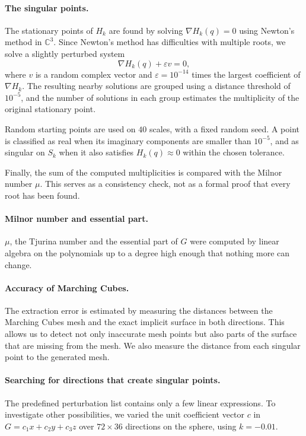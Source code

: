 \documentclass[12pt, a4paper]{article}
\theoremstyle{plain}
\theoremstyle{definition}
\theoremstyle{remark}
\theoremstyle{definition}
\begin{document}
\paragraph{The singular points.}
The stationary points of $H_k$ are found by solving
$\nabla H_k(q)=0$ using Newton's method in $\mathbb{C}^3$.
Since Newton's method has difficulties with multiple roots,
we solve a slightly perturbed system
\[
\nabla H_k(q)+\varepsilon v=0,
\]
where $v$ is a random complex vector and $\varepsilon=10^{-14}$
times the largest coefficient of $\nabla H_k$. The resulting nearby
solutions are grouped using a distance threshold of $10^{-5}$,
and the number of solutions in each group estimates the
multiplicity of the original stationary point.

Random starting points are used on $40$ scales, with a fixed
random seed. A point is classified as real when its imaginary
components are smaller than $10^{-5}$, and as singular on $S_k$
when it also satisfies $H_k(q)\approx0$ within the chosen tolerance.

Finally, the sum of the computed multiplicities is compared with
the Milnor number $\mu$. This serves as a consistency check, not
as a formal proof that every root has been found.


\paragraph{Milnor number and essential part.} $\mu$, the Tjurina number and the
essential part of $G$ were computed by linear algebra on the polynomials up to a degree high enough that nothing more can change.\cite{greuel2008singular}


\paragraph{Accuracy of Marching Cubes.}
The extraction error is estimated by measuring the distances between the Marching Cubes mesh and the exact implicit surface in both directions. 
This allows us to detect not only inaccurate mesh points but also parts of the surface that are missing from the mesh. 
We also measure the distance from each singular point to the generated mesh.


\paragraph{Searching for directions that create singular points.}
The predefined perturbation list contains only a few linear expressions. 
To investigate other possibilities, we varied the unit coefficient vector $c$ in $G=c_1x+c_2y+c_3z$ over $72\times36$ directions on the sphere, using $k=-0.01$.
\end{document}
